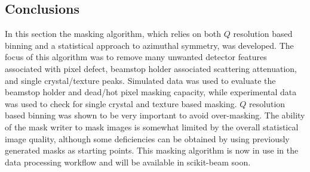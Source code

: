 \subsection{Conclusions}
In this section the masking algorithm, which relies on both $Q$ resolution based binning and a statistical approach to azimuthal symmetry, was developed.
The focus of this algorithm was to remove many unwanted detector features associated with pixel defect, beamstop holder associated scattering attenuation, and single crystal/texture peaks.
Simulated data was used to evaluate the beamstop holder and dead/hot pixel masking capacity, while experimental data was used to check for single crystal and texture based masking.
$Q$ resolution based binning was shown to be very important to avoid over-masking.
The ability of the mask writer to mask images is somewhat limited by the overall statistical image quality, although some deficiencies can be obtained by using previously generated masks as starting points.
This masking algorithm is now in use in the data processing workflow and will be available in scikit-beam soon.
